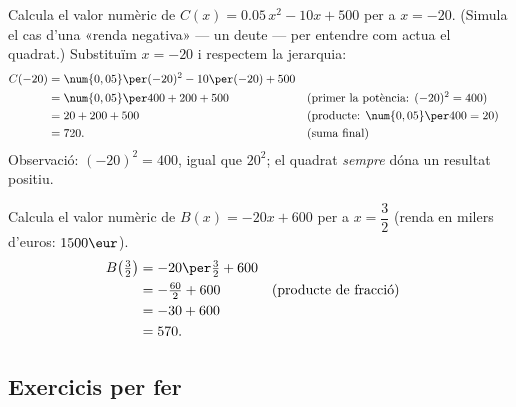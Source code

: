 \begin{exresolt}
Calcula el valor numèric de $C(x) = \num{0,05}\,x^2 - 10x + 500$ per a $x = -20$.
(Simula el cas d'una «renda negativa» — un deute — per entendre com actua el quadrat.)
\solucio
Substituïm $x = -20$ i respectem la jerarquia:
\begin{align*}
C(-20) &= \num{0,05}\per(-20)^2 - 10\per(-20) + 500 \\
       &= \num{0,05}\per 400 + 200 + 500 &&\text{(primer la potència: $(-20)^2=400$)} \\
       &= 20 + 200 + 500                  &&\text{(producte: $\num{0,05}\per400=20$)} \\
       &= 720.                            &&\text{(suma final)}
\end{align*}
Observació: $(-20)^2 = 400$, igual que $20^2$; el quadrat \emph{sempre} dóna
un resultat positiu.
\end{exresolt}

\begin{exresolt}
Calcula el valor numèric de $B(x) = -20x + 600$ per a $x = \dfrac{3}{2}$
(renda en milers d'euros: $1500\eur$).
\solucio
\begin{align*}
B\!\left(\tfrac{3}{2}\right) &= -20\per\tfrac{3}{2} + 600 \\
                             &= -\tfrac{60}{2} + 600 &&\text{(producte de fracció)} \\
                             &= -30 + 600 \\
                             &= 570.
\end{align*}
\end{exresolt}

\subsection{Exercicis per fer}

